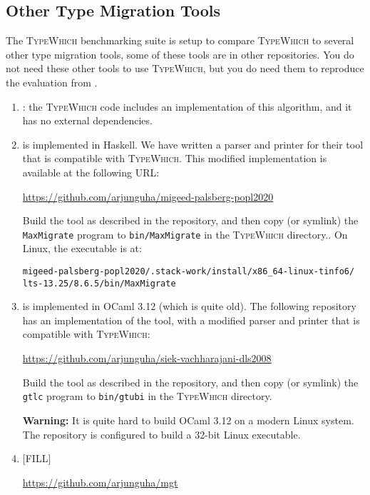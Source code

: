 \documentclass{article}
\newcommand{\system}{\textsc{TypeWhich}\xspace}
\begin{document}
\subsection{Other Type Migration Tools}

The \system benchmarking suite is setup to compare \system to several other
type migration tools, some of these tools are in other repositories. You do not
need these other tools to use \system, but you do need them to reproduce the
evaluation from \citet{typewhich}.

\begin{enumerate}

\item \citet{rastogi:gti}: the \system code includes an implementation of this
algorithm, and it has no external dependencies.

\item \citet{migeed:decidable} is implemented in Haskell. We have written a
parser and printer for their tool that is compatible with \system. This
modified implementation is available at the following URL:

\url{https://github.com/arjunguha/migeed-palsberg-popl2020}

Build the tool as described in the repository, and then copy (or symlink) the
\texttt{MaxMigrate} program to \texttt{bin/MaxMigrate} in the \system directory..
On Linux, the executable is at:

\begin{verbatim}
migeed-palsberg-popl2020/.stack-work/install/x86_64-linux-tinfo6/
lts-13.25/8.6.5/bin/MaxMigrate
\end{verbatim}

\item \citet{siek:gti} is implemented in OCaml 3.12 (which is quite old).
The following repository has an implementation of the tool, with a modified
parser and printer that is compatible with \system:

\url{https://github.com/arjunguha/siek-vachharajani-dls2008}

Build the tool as described in the repository, and then copy (or symlink)
the \texttt{gtlc} program to \texttt{bin/gtubi} in the \system directory.

\textbf{Warning:} It is quite hard to build OCaml 3.12 on a modern Linux
system. The repository is configured to build a 32-bit Linux executable.

\item \citet{campora:migrating} [FILL]
   
   \url{https://github.com/arjunguha/mgt}

\end{enumerate}
\end{document}
